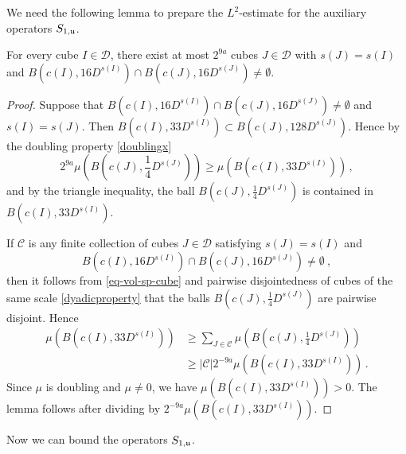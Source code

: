 We need the following lemma to prepare the $L^2$-estimate for the auxiliary operators $S_{1, {\mathfrak u}}$.

\begin{lemma}
    \label{boundary-overlap}
    \leanok
    For every cube $I \in \mathcal{D}$, there exist at most $2^{9a}$ cubes $J \in \mathcal{D}$ with $s(J) = s(I)$ and $B(c(I), 16D^{s(I)}) \cap B(c(J), 16 D^{s(J)}) \ne \emptyset$.
\end{lemma}

\begin{proof}
    \leanok
    Suppose that $B(c(I), 16 D^{s(I)}) \cap B(c(J), 16 D^{s(J)}) \ne \emptyset$ and $s(I) = s(J)$. Then $B(c(I), 33 D^{s(I)}) \subset B(c(J), 128 D^{s(J)})$. Hence by the doubling property \eqref{doublingx}
    $$
        2^{9a}\mu(B(c(J), \frac{1}{4}D^{s(J)})) \ge \mu(B(c(I), 33 D^{s(I)}))\,,
    $$
    and by the triangle inequality, the ball $B(c(J), \frac{1}{4}D^{s(J)})$ is contained in $B(c(I), 33 D^{s(I)})$.

    If $\mathcal{C}$ is any finite collection of cubes $J \in \mathcal{D}$ satisfying $s(J) = s(I)$ and
    \begin{equation*}
        B(c(I), 16 D^{s(I)}) \cap B(c(J), 16 D^{s(J)}) \ne\emptyset\ ,
    \end{equation*} then it follows from \eqref{eq-vol-sp-cube} and pairwise disjointedness of cubes of the same scale \eqref{dyadicproperty} that the balls $B(c(J), \frac{1}{4} D^{s(J)})$ are pairwise disjoint. Hence
    \begin{align*}
        \mu(B(c(I), 33 D^{s(I)})) &\ge \sum_{J \in \mathcal{C}} \mu(B(c(J), \frac{1}{4}D^{s(J)}))\\
        &\ge |\mathcal{C}| 2^{-9a} \mu(B(c(I), 33 D^{s(I)}))\,.
    \end{align*}
    Since $\mu$ is doubling and $\mu \ne 0$, we have $\mu(B(c(I), 33D^{s(I)})) > 0$. The lemma follows after dividing by $2^{-9a}\mu(B(c(I), 33D^{s(I)}))$.
\end{proof}

Now we can bound the operators $S_{1, {\mathfrak u}}$.

